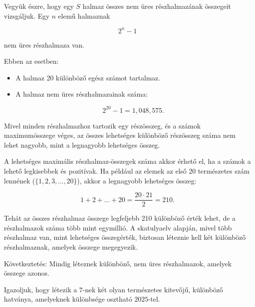 \begin{solution}
	Vegyük észre, hogy egy $S$ halmaz összes nem üres részhalmazának
	összegeit vizsgáljuk. Egy $n$ elemű halmaznak
	
	\[
	2^{n}-1
	\]
	
	nem üres részhalmaza van.
	
	Ebben az esetben: 
	\begin{itemize}
		\item A halmaz 20 különböző egész számot tartalmaz. 
		\item A halmaz nem üres részhalmazainak száma:
		
		\[
		2^{20}-1=1,048,575.
		\]
		
	\end{itemize}
	Mivel minden részhalmazhoz tartozik egy részösszeg, és a számok maximumösszege
	véges, az összes lehetséges különböző részösszeg száma nem lehet nagyobb,
	mint a legnagyobb lehetséges összeg.
	
	A lehetséges maximális részhalmaz-összegek száma akkor érhető el,
	ha a számok a lehető legkisebbek és pozitívak. Ha például az elemek
	az első 20 természetes szám lennének ($\{1,2,3,\dots,20\}$), akkor
	a legnagyobb lehetséges összeg:
	
	\[
	1+2+\dots+20=\frac{20\cdot21}{2}=210.
	\]
	
	Tehát az összes részhalmaz összege legfeljebb 210 különböző érték
	lehet, de a részhalmazok száma több mint egymillió. A skatulyaelv
	alapján, mivel több részhalmaz van, mint lehetséges összegérték, biztosan
	léteznie kell két különböző részhalmaznak, amelyek összege megegyezik.
	
	Következtetés: Mindig léteznek különböző, nem üres részhalmazok, amelyek
	összege azonos. 
\end{solution}
\begin{extraproblem}
	Igazoljuk, hogy létezik a $7$-nek két olyan természetes kitevőjű,
	különböző hatványa, amelyeknek különbsége osztható $2025$-tel. 
\end{extraproblem}

